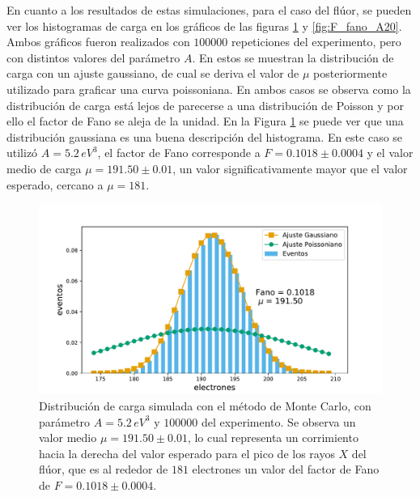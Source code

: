 En cuanto a los resultados de estas simulaciones, para el caso del flúor, se pueden ver los histogramas de carga en los gráficos de las figuras \ref{fig:F_fano_A5.2} y \ref{fig:F_fano_A20}. Ambos gráficos fueron realizados con $100000$ repeticiones del experimento, pero con distintos valores del parámetro $A$. En estos se muestran la distribución de carga con un ajuste gaussiano, de cual se deriva el valor de $\mu$ posteriormente utilizado para graficar una curva poissoniana. En ambos casos se observa como la distribución de carga está lejos de parecerse a una distribución de Poisson y por ello el factor de Fano se aleja de la unidad. En la Figura \ref{fig:F_fano_A5.2} se puede ver que una distribución gaussiana es una buena descripción del histograma. En este caso se utilizó $A = 5.2\,\si{eV}^{3}$, el factor de Fano corresponde a $F = 0.1018 \pm 0.0004$ y el valor medio de carga $\mu = 191.50 \pm 0.01$, un valor significativamente mayor que el valor esperado, cercano a $\mu = 181$.
\begin{figure}[h]
    \centering
    \includegraphics[scale=0.5]{Figs/F_Fano_E677_A5.2_Eloss0_100ktrials.pdf}
    \caption{Distribución de carga simulada con el método de Monte Carlo, con parámetro $A = 5.2\,\si{eV}^{3}$ y $100000$ del experimento. Se observa un valor medio $\mu = 191.50 \pm 0.01$, lo cual representa un corrimiento hacia la derecha del valor esperado para el pico de los rayos $X$ del flúor, que es al rededor de $181$ electrones un valor del factor de Fano de $F = 0.1018 \pm 0.0004$.}
    \label{fig:F_fano_A5.2}
\end{figure}
